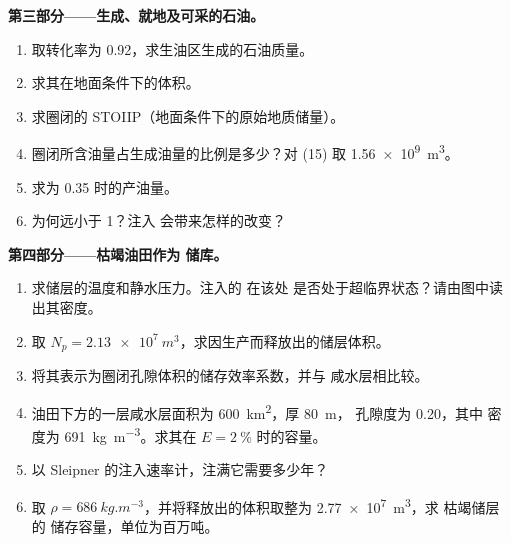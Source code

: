 \begin{problem}
\noindent\textbf{第三部分——生成、就地及可采的石油。}
\begin{enumerate}[resume]
  \item 取转化率为 0.92，求生油区生成的石油质量。
  \item 求其在地面条件下的体积。
  \item 求圈闭的 STOIIP（地面条件下的原始地质储量）。
  \item 圈闭所含油量占生成油量的比例是多少？对 (15) 取 \qty{1.56e9}{m^3}。
  \item 求为 0.35 时的产油量。
  \item 为何远小于 1？注入  会带来怎样的改变？
\end{enumerate}

\noindent\textbf{第四部分——枯竭油田作为  储库。}
\begin{enumerate}[resume]
  \item 求储层的温度和静水压力。注入的  在该处
        是否处于超临界状态？请由图中读出其密度。
  \item 取 $N_p = \qty{2.13e7}{m^3}$，求因生产而释放出的储层体积。
  \item 将其表示为圈闭孔隙体积的储存效率系数，并与
        咸水层相比较。
  \item 油田下方的一层咸水层面积为 \qty{600}{km^2}，厚 \qty{80}{m}，
        孔隙度为 0.20，其中  密度为 \qty{691}{kg.m^{-3}}。求其在 $E =
        \qty{2}{\percent}$ 时的容量。
  \item 以 Sleipner 的注入速率计，注满它需要多少年？
  \item 取 $\rho = \qty{686}{kg.m^{-3}}$，并将释放出的体积取整为 \qty{2.77e7}{m^3}，求
        枯竭储层的  储存容量，单位为百万吨。
\end{enumerate}
\end{problem}
